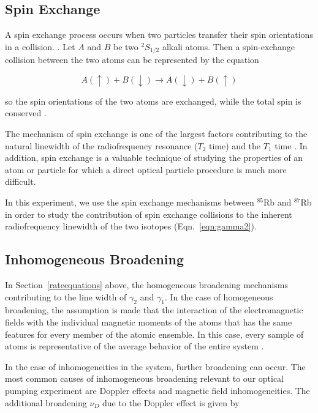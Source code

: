 \subsection{Spin Exchange}\label{spinexchange}

A spin exchange process occurs when two particles transfer their spin orientations in a collision. \cite{bernheim}. Let $A$ and $B$ be two $^2S_{1/2}$
alkali atoms. Then a spin-exchange collision between the two atoms
can be represented by the equation

\begin{equation}
A(\uparrow) + B(\downarrow) \rightarrow A(\downarrow) + B(\uparrow)
\end{equation}

so the spin orientations of the two atoms are exchanged, while the
total spin is conserved \cite{happer}.  

The mechanism of spin exchange is one of the largest factors
contributing to the natural linewidth of the radiofrequency resonance ($T_2$ time) and
the $T_1$ time \cite{vanier}. In addition, spin exchange is a valuable
technique of studying the properties of an atom or particle for which
a direct optical particle procedure is much more difficult.

In this experiment, we use the spin exchange mechanisms between
$^{85}$Rb and $^{87}$Rb in order to study the contribution of spin
exchange collisions to the inherent radiofrequency linewidth of the two isotopes
(Eqn.~\ref{eqn:gamma2}).

\subsection{Inhomogeneous Broadening}\label{inhomogeneousbroadening}

In Section~\ref{rateequations} above, the homogeneous broadening
mechanisms contributing to the line width of $\gamma_2$ and
$\gamma_1$. In the case of homogeneous broadening, the assumption is
made that the interaction of the electromagnetic fields with the
individual magnetic moments of the atoms that has the same features
for every member of the atomic ensemble. In this case, every sample of
atoms is representative of the average behavior of the entire system
\cite{vanier}. 

In the case of inhomogeneities in the system, further broadening can
occur. The most common causes of inhomogeneous broadening relevant to
our optical pumping experiment are Doppler effects and magnetic field
inhomogeneities. The additional broadening $\nu_D$ due to the Doppler effect
is given by

